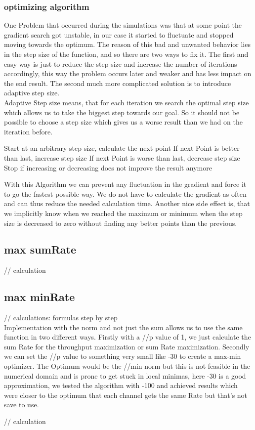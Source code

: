 \subsubsection{optimizing algorithm}
One Problem that occurred during the simulations was that at some point the gradient search got unstable, in our case it started to fluctuate and stopped moving towards the optimum. The reason of this bad and unwanted behavior lies in the step size of the function, and so there are two ways to fix it. The first and easy way is just to reduce the step size and increase the number of iterations accordingly, this way the problem occurs later and weaker and has less impact on the end result. The second much more complicated solution is to introduce adaptive step size.\\
Adaptive Step size means, that for each iteration we search the optimal step size which allows us to take the biggest step towards our goal. So it should not be possible to choose a step size which gives us a worse result than we had on the iteration before.
\begin{algorithm}
	Start at an arbitrary step size, calculate the next point
	If next Point is better than last, increase step size
	If next Point is worse than last, decrease step size
	Stop if increasing or decreasing does not improve the result anymore
\end{algorithm}
With this Algorithm we can prevent any fluctuation in the gradient and force it to go the fastest possible way. We do not have to calculate the gradient as often and can thus reduce the needed calculation time. Another nice side effect is, that we implicitly know when we reached the maximum or minimum when the step size is decreased to zero without finding any better points than the previous.

\subsection{max sumRate}

// calculation

\subsection{max minRate}
// calculations: formulas step by step\\
Implementation with the norm and not just the sum allows us to use the same function in two different ways. Firstly with a //p value of 1, we just calculate the sum Rate for the throughput maximization or sum Rate maximization. Secondly we can set the //p value to something very small like -30 to create a max-min optimizer. The Optimum would be the //min norm but this is not feasible in the numerical domain and is prone to get stuck in local minimas, here -30 is a good approximation, we tested the algorithm with -100 and achieved results which were closer to the optimum that each channel gets the same Rate but that's not save to use.


// calculation